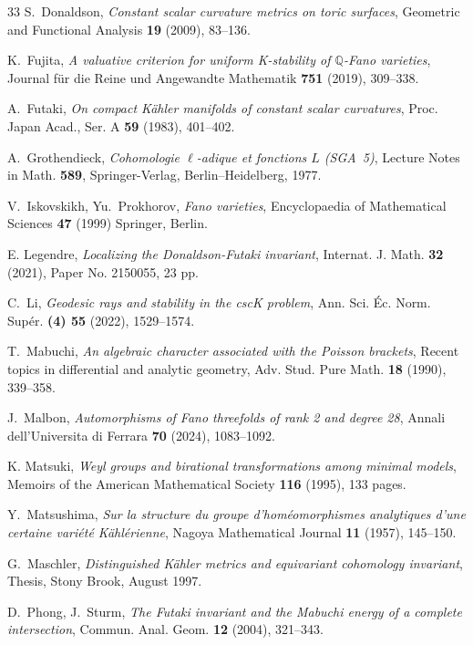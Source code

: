 \documentclass[12pt]{amsart}
\theoremstyle{definition}
\theoremstyle{remark}
\begin{document}
\begin{thebibliography}{33}
S.~Donaldson, \textit{Constant scalar curvature metrics on toric surfaces}, Geometric and Functional Analysis \textbf{19} (2009), 83--136.

K.~Fujita, \textit{A valuative criterion for uniform K-stability of $\mathbb{Q}$-Fano varieties}, Journal f\"ur die Reine und Angewandte Mathematik \textbf{751} (2019), 309--338.

A.~Futaki, \textit{On compact K\"ahler manifolds of constant scalar curvatures}, Proc. Japan Acad., Ser. A \textbf{59} (1983), 401--402.

A.~Grothendieck, \textit{Cohomologie $\ell$-adique et fonctions $L$ (SGA~5)},
Lecture Notes in Math. \textbf{589}, Springer-Verlag, Berlin--Heidelberg, 1977.

V.~Iskovskikh, Yu.~Prokhorov, \textit{Fano varieties},  Encyclopaedia of Mathematical Sciences \textbf{47} (1999) Springer, Berlin.

E. Legendre, \textit{Localizing the Donaldson-Futaki invariant}, Internat. J. Math. \textbf{32} (2021), Paper No. 2150055, 23 pp.

C.~Li, \textit{Geodesic rays and stability in the cscK problem}, Ann. Sci. Éc. Norm. Supér. \textbf{(4) 55} (2022), 1529--1574.

T.~Mabuchi, \textit{An algebraic character associated with the Poisson brackets}, Recent topics in differential and analytic geometry, Adv. Stud. Pure Math. \textbf{18} (1990), 339--358.

J.~Malbon, \textit{Automorphisms of Fano threefolds of rank 2 and degree 28}, Annali dell'Universita di Ferrara \textbf{70} (2024), 1083--1092.

K. Matsuki, \textit{Weyl groups and birational transformations among minimal models}, Memoirs of the American Mathematical Society \textbf{116} (1995), 133 pages.

Y.~Matsushima, \textit{Sur la structure du groupe d'hom\'eomorphismes analytiques d'une certaine  vari\'et\'e K\"ahl\'erienne}, Nagoya Mathematical Journal \textbf{11} (1957), 145--150.

G.~Maschler, \textit{Distinguished K\"ahler metrics and equivariant cohomology invariant}, Thesis,
Stony Brook, August 1997.

D.~Phong, J.~Sturm, \textit{The Futaki invariant and the Mabuchi energy of a complete intersection}, Commun. Anal. Geom. \textbf{12} (2004), 321--343.


\end{thebibliography}
\end{document}
